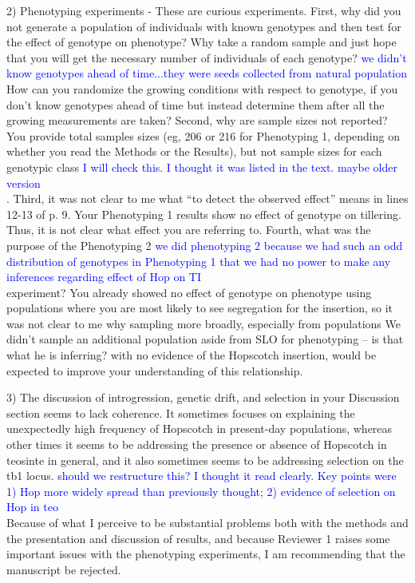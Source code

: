 \documentclass[11pt]{article}
\newcommand{\res}[1]{\noindent \textcolor{blue}{{#1}} \\}
\begin{document}
2) Phenotyping experiments - These are curious experiments.  First, why did you not generate a population of individuals with known genotypes and then test for the effect of genotype on phenotype?  Why take a random sample and just hope that you will get the necessary number of individuals of each genotype?  \res{we didn't know genotypes ahead of time...they were seeds collected from natural population} How can you randomize the growing conditions with respect to genotype, if you don’t know genotypes ahead of time but instead determine them after all the growing measurements are taken? Second, why are sample sizes not reported?  You provide total samples sizes (eg, 206 or 216 for Phenotyping 1, depending on whether you read the Methods or the Results), but not sample sizes for each genotypic class \res{I will check this. I thought it was listed in the text. maybe older version}.  Third, it was not clear to me what “to detect the observed effect” means in lines 12-13 of p. 9.  Your Phenotyping 1 results show no effect of genotype on tillering.  Thus, it is not clear what effect you are referring to.  Fourth, what was the purpose of the Phenotyping 2 \res{we did phenotyping 2 because we had such an odd distribution of genotypes in Phenotyping 1 that we had no power to make any inferences regarding effect of Hop on TI} experiment?  You already showed no effect of genotype on phenotype using populations where you are most likely to see segregation for the insertion, so it was not clear to me why sampling more broadly, especially from populations {We didn't sample an additional population aside from SLO for phenotyping -- is that what he is inferring?} with no evidence of the Hopscotch insertion, would be expected to improve your understanding of this relationship.

3) The discussion of introgression, genetic drift, and selection in your Discussion section seems to lack coherence.  It sometimes focuses on explaining the unexpectedly high frequency of Hopscotch in present-day populations, whereas other times it seems to be addressing the presence or absence of Hopscotch in teosinte in general, and it also sometimes seems to be addressing selection on the tb1 locus. \res{should we restructure this? I thought it read clearly. Key points were 1) Hop more widely spread than previously thought; 2) evidence of selection on Hop in teo}

Because of what I perceive to be substantial problems both with the methods and the presentation and discussion of results, and because Reviewer 1 raises some important issues with the phenotyping experiments, I am recommending that the manuscript be rejected.
\end{document}
